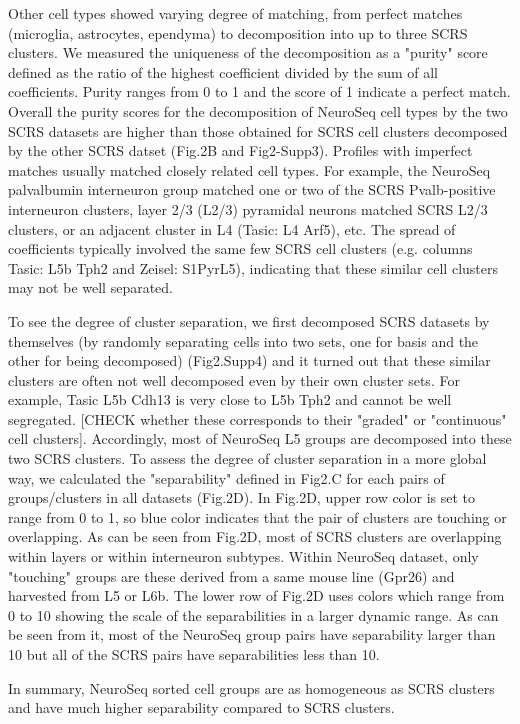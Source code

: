 Other cell types showed varying degree of matching, from perfect matches (microglia, astrocytes, ependyma) to decomposition into up to three SCRS clusters. We measured the uniqueness of the decomposition as a "purity" score defined as the ratio of the highest coefficient divided by the sum of all coefficients. Purity ranges from 0 to 1 and the score of 1 indicate a perfect match. Overall the purity scores for the decomposition of NeuroSeq cell types by the two SCRS datasets are higher than those obtained for SCRS cell clusters decomposed by the other SCRS datset (Fig.2B and Fig2-Supp3). Profiles with imperfect matches usually matched closely related cell types. For example, the NeuroSeq palvalbumin interneuron group matched one or two of the SCRS Pvalb-positive interneuron clusters, layer 2/3 (L2/3) pyramidal neurons matched SCRS L2/3 clusters, or an adjacent cluster in L4 (Tasic: L4 Arf5), etc. The spread of coefficients typically involved the same few SCRS cell clusters (e.g. columns Tasic: L5b Tph2 and Zeisel: S1PyrL5), indicating that these similar cell clusters may not be well separated. 

To see the degree of cluster separation, we first decomposed SCRS datasets by themselves (by randomly separating cells into two sets, one for basis and the other for being decomposed) (Fig2.Supp4) and it turned out that these similar clusters are often not well decomposed even by their own cluster sets. For example, Tasic L5b Cdh13 is very close to L5b Tph2 and cannot be well segregated. [CHECK whether these corresponds to their "graded" or "continuous" cell clusters]. Accordingly, most of NeuroSeq L5 groups are decomposed into these two SCRS clusters. 
To assess the degree of cluster separation in a more global way, we calculated the "separability" defined in Fig2.C for each pairs of groups/clusters in all datasets (Fig.2D). In Fig.2D, upper row color is set to range from 0 to 1, so blue color indicates that the pair of clusters are touching or overlapping. As can be seen from Fig.2D, most of SCRS clusters are overlapping within layers or within interneuron subtypes. Within NeuroSeq dataset, only "touching" groups are these derived from a same mouse line (Gpr26) and harvested from L5 or L6b.  The lower row of Fig.2D uses colors which range from 0 to 10 showing the scale of the separabilities in a larger dynamic range. As can be seen from it, most of the NeuroSeq group pairs have separability larger than 10 but all of the SCRS pairs have separabilities less than 10.

In summary, NeuroSeq sorted cell groups are as homogeneous as SCRS clusters and have much higher separability compared to SCRS clusters. 









